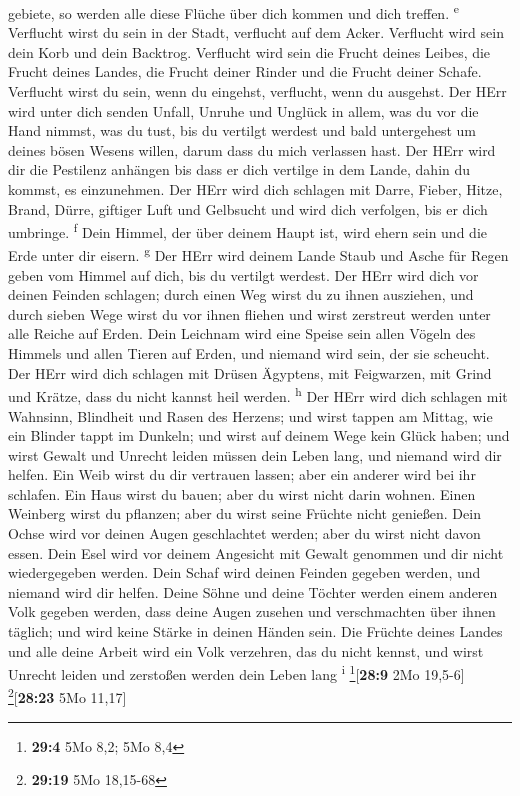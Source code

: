 gebiete, so werden alle diese Flüche über dich kommen und dich treffen.
\textsuperscript{e}  Verflucht wirst du sein in der
Stadt, verflucht auf dem Acker.  Verflucht wird sein dein
Korb und dein Backtrog.  Verflucht wird sein die Frucht
deines Leibes, die Frucht deines Landes, die Frucht deiner Rinder und
die Frucht deiner Schafe.  Verflucht wirst du sein, wenn
du eingehst, verflucht, wenn du ausgehst.  Der HErr wird
unter dich senden Unfall, Unruhe und Unglück in allem, was du vor die
Hand nimmst, was du tust, bis du vertilgt werdest und bald untergehest
um deines bösen Wesens willen, darum dass du mich verlassen hast.
 Der HErr wird dir die Pestilenz anhängen bis dass er
dich vertilge in dem Lande, dahin du kommst, es einzunehmen.
 Der HErr wird dich schlagen mit Darre, Fieber, Hitze,
Brand, Dürre, giftiger Luft und Gelbsucht und wird dich verfolgen, bis
er dich umbringe. \textsuperscript{f}  Dein Himmel, der
über deinem Haupt ist, wird ehern sein und die Erde unter dir eisern.
\textsuperscript{g}  Der HErr wird deinem Lande Staub und
Asche für Regen geben vom Himmel auf dich, bis du vertilgt werdest.
 Der HErr wird dich vor deinen Feinden schlagen; durch
einen Weg wirst du zu ihnen ausziehen, und durch sieben Wege wirst du
vor ihnen fliehen und wirst zerstreut werden unter alle Reiche auf
Erden.  Dein Leichnam wird eine Speise sein allen Vögeln
des Himmels und allen Tieren auf Erden, und niemand wird sein, der sie
scheucht.  Der HErr wird dich schlagen mit Drüsen
Ägyptens, mit Feigwarzen, mit Grind und Krätze, dass du nicht kannst
heil werden. \textsuperscript{h}  Der HErr wird dich
schlagen mit Wahnsinn, Blindheit und Rasen des Herzens; 
und wirst tappen am Mittag, wie ein Blinder tappt im Dunkeln; und wirst
auf deinem Wege kein Glück haben; und wirst Gewalt und Unrecht leiden
müssen dein Leben lang, und niemand wird dir helfen.  Ein
Weib wirst du dir vertrauen lassen; aber ein anderer wird bei ihr
schlafen. Ein Haus wirst du bauen; aber du wirst nicht darin wohnen.
Einen Weinberg wirst du pflanzen; aber du wirst seine Früchte nicht
genießen.  Dein Ochse wird vor deinen Augen geschlachtet
werden; aber du wirst nicht davon essen. Dein Esel wird vor deinem
Angesicht mit Gewalt genommen und dir nicht wiedergegeben werden. Dein
Schaf wird deinen Feinden gegeben werden, und niemand wird dir helfen.
 Deine Söhne und deine Töchter werden einem anderen Volk
gegeben werden, dass deine Augen zusehen und verschmachten über ihnen
täglich; und wird keine Stärke in deinen Händen sein. 
Die Früchte deines Landes und alle deine Arbeit wird ein Volk verzehren,
das du nicht kennst, und wirst Unrecht leiden und zerstoßen werden dein
Leben lang \textsuperscript{i} \footnote{\textbf{29:4} 5Mo 8,2; 5Mo 8,4}{[}\textbf{28:9}
2Mo 19,5-6{]} \footnote{\textbf{29:19} 5Mo 18,15-68}{[}\textbf{28:23}
5Mo 11,17{]}

